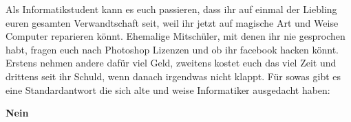 Als Informatikstudent kann es euch passieren, dass ihr auf einmal der Liebling
euren gesamten Verwandtschaft seit,
weil ihr jetzt auf magische Art und Weise Computer
reparieren k\"onnt. Ehemalige Mitsch\"uler, mit denen ihr nie gesprochen habt,
fragen euch nach Photoshop Lizenzen und ob ihr facebook hacken
k\"onnt. Erstens nehmen andere daf\"ur viel Geld, zweitens kostet euch das viel
Zeit und drittens seit ihr Schuld, wenn danach irgendwas nicht klappt. F\"ur
sowas gibt es eine Standardantwort die sich alte und weise Informatiker
ausgedacht haben:
\begin{center}{\sffamily\textbf{\Huge Nein}}\end{center}


